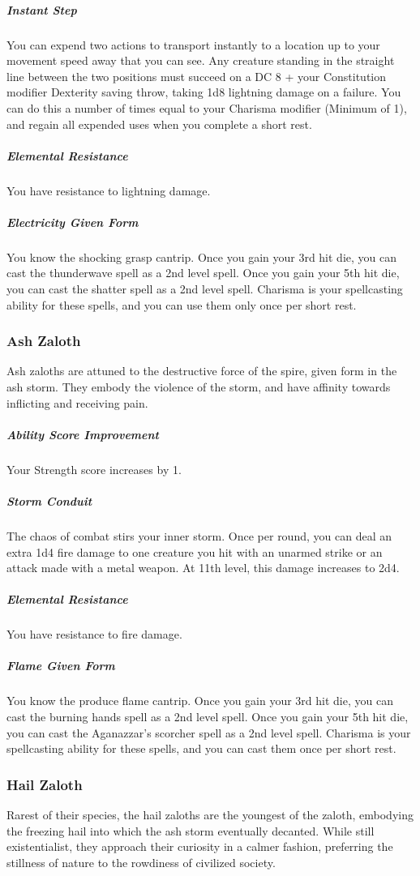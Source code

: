     \subparagraph{Instant Step} You can expend two actions to transport instantly to a location up to your movement speed away that you can see.
    Any creature standing in the straight line between the two positions must succeed on a DC 8 + your Constitution modifier Dexterity saving throw, taking 1d8 lightning damage on a failure.
    You can do this a number of times equal to your Charisma modifier (Minimum of 1), and regain all expended uses when you complete a short rest.

    \subparagraph{Elemental Resistance} You have resistance to lightning damage.

    \subparagraph{Electricity Given Form} You know the shocking grasp cantrip.
    Once you gain your 3rd hit die, you can cast the thunderwave spell as a 2nd level spell.
    Once you gain your 5th hit die, you can cast the shatter spell as a 2nd level spell.
    Charisma is your spellcasting ability for these spells, and you can use them only once per short rest.

\subsubsection{Ash Zaloth}
    Ash zaloths are attuned to the destructive force of the spire, given form in the ash storm.
    They embody the violence of the storm, and have affinity towards inflicting and receiving pain.

    \subparagraph{Ability Score Improvement} Your Strength score increases by 1.

    \subparagraph{Storm Conduit} The chaos of combat stirs your inner storm.
    Once per round, you can deal an extra 1d4 fire damage to one creature you hit with an unarmed strike or an attack made with a metal weapon.
    At 11th level, this damage increases to 2d4.

    \subparagraph{Elemental Resistance} You have resistance to fire damage.

    \subparagraph{Flame Given Form} You know the produce flame cantrip.
    Once you gain your 3rd hit die, you can cast the burning hands spell as a 2nd level spell.
    Once you gain your 5th hit die, you can cast the Aganazzar's scorcher spell as a 2nd level spell.
    Charisma is your spellcasting ability for these spells, and you can cast them once per short rest.

\subsubsection{Hail Zaloth}
    Rarest of their species, the hail zaloths are the youngest of the zaloth, embodying the freezing hail into which the ash storm eventually decanted.
    While still existentialist, they approach their curiosity in a calmer fashion, preferring the stillness of nature to the rowdiness of civilized society.

